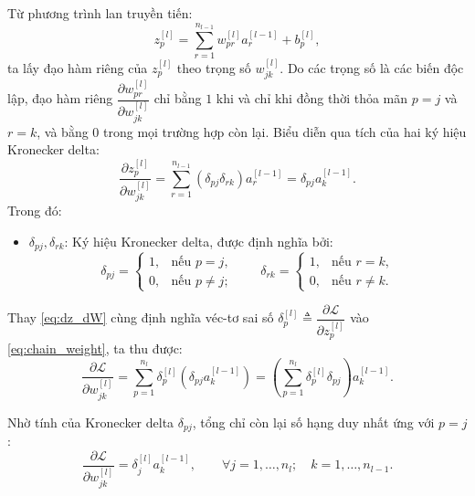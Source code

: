 Từ phương trình lan truyền tiến:
\begin{equation}
z_p^{[l]} = \sum_{r=1}^{n_{l-1}} w_{pr}^{[l]} a_r^{[l-1]} + b_p^{[l]},
\end{equation}
ta lấy đạo hàm riêng của $z_p^{[l]}$ theo trọng số $w_{jk}^{[l]}$. Do các trọng số là các biến độc lập, đạo hàm riêng $\dfrac{\partial w_{pr}^{[l]}}{\partial w_{jk}^{[l]}}$ chỉ bằng $1$ khi và chỉ khi đồng thời thỏa mãn $p = j$ và $r = k$, và bằng $0$ trong mọi trường hợp còn lại. Biểu diễn qua tích của hai ký hiệu Kronecker delta:
\begin{equation}
\frac{\partial z_p^{[l]}}{\partial w_{jk}^{[l]}} = \sum_{r=1}^{n_{l-1}} \left( \delta_{pj} \delta_{rk} \right) a_r^{[l-1]} = \delta_{pj} a_k^{[l-1]}.
\label{eq:dz_dW}
\end{equation}
Trong đó:
\begin{itemize}
    \item $\delta_{pj}, \delta_{rk}$: Ký hiệu Kronecker delta, được định nghĩa bởi:
    \begin{equation}
    \delta_{pj} = \begin{cases} 1, & \text{nếu } p = j, \\ 0, & \text{nếu } p \neq j; \end{cases} \qquad 
    \delta_{rk} = \begin{cases} 1, & \text{nếu } r = k, \\ 0, & \text{nếu } r \neq k. \end{cases}
    \end{equation}
\end{itemize}

Thay \eqref{eq:dz_dW} cùng định nghĩa véc-tơ sai số $\delta_p^{[l]} \triangleq \dfrac{\partial\mathcal{L}}{\partial z_p^{[l]}}$ vào \eqref{eq:chain_weight}, ta thu được:
\begin{equation}
\frac{\partial\mathcal{L}}{\partial w_{jk}^{[l]}} = \sum_{p=1}^{n_l} \delta_p^{[l]} \left( \delta_{pj} a_k^{[l-1]} \right) = \left( \sum_{p=1}^{n_l} \delta_p^{[l]} \delta_{pj} \right) a_k^{[l-1]}.
\end{equation}

Nhờ tính của Kronecker delta $\delta_{pj}$, tổng chỉ còn lại số hạng duy nhất ứng với $p = j$:
\begin{equation}
\frac{\partial\mathcal{L}}{\partial w_{jk}^{[l]}} = \delta_j^{[l]} a_k^{[l-1]}, \qquad \forall j = 1, \dots, n_l; \quad k = 1, \dots, n_{l-1}.
\label{eq:bp_weight_component}
\end{equation}

